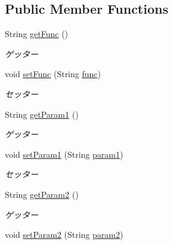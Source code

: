 \subsection*{Public Member Functions}
\begin{DoxyCompactItemize}
\item 
String \mbox{\hyperlink{classjp_1_1gr_1_1java__conf_1_1yuta__yoshinaga_1_1reversi_1_1model_1_1_funcs_json_adb9267487ecb01372d9332bee84f6378}{get\+Func}} ()
\begin{DoxyCompactList}\small\item\em ゲッター \end{DoxyCompactList}\item 
void \mbox{\hyperlink{classjp_1_1gr_1_1java__conf_1_1yuta__yoshinaga_1_1reversi_1_1model_1_1_funcs_json_adf43551693f93f2db4751a6fa8695d94}{set\+Func}} (String \mbox{\hyperlink{classjp_1_1gr_1_1java__conf_1_1yuta__yoshinaga_1_1reversi_1_1model_1_1_funcs_json_a8ca78c0a7064d28493ff6191e83f0d9b}{func}})
\begin{DoxyCompactList}\small\item\em セッター \end{DoxyCompactList}\item 
String \mbox{\hyperlink{classjp_1_1gr_1_1java__conf_1_1yuta__yoshinaga_1_1reversi_1_1model_1_1_funcs_json_a17ed3cd16403a8b83b61fa069556c68e}{get\+Param1}} ()
\begin{DoxyCompactList}\small\item\em ゲッター \end{DoxyCompactList}\item 
void \mbox{\hyperlink{classjp_1_1gr_1_1java__conf_1_1yuta__yoshinaga_1_1reversi_1_1model_1_1_funcs_json_ac7e00df5981b30ec420ef250477d9b23}{set\+Param1}} (String \mbox{\hyperlink{classjp_1_1gr_1_1java__conf_1_1yuta__yoshinaga_1_1reversi_1_1model_1_1_funcs_json_a2d271ee18dc5c39d0f3ab52bfde0bc27}{param1}})
\begin{DoxyCompactList}\small\item\em セッター \end{DoxyCompactList}\item 
String \mbox{\hyperlink{classjp_1_1gr_1_1java__conf_1_1yuta__yoshinaga_1_1reversi_1_1model_1_1_funcs_json_a032d83a0530a2f08fdaeba14eb5c1dcd}{get\+Param2}} ()
\begin{DoxyCompactList}\small\item\em ゲッター \end{DoxyCompactList}\item 
void \mbox{\hyperlink{classjp_1_1gr_1_1java__conf_1_1yuta__yoshinaga_1_1reversi_1_1model_1_1_funcs_json_aa1d17801d47f0d701f6792fa5f06e435}{set\+Param2}} (String \mbox{\hyperlink{classjp_1_1gr_1_1java__conf_1_1yuta__yoshinaga_1_1reversi_1_1model_1_1_funcs_json_a9f1f2c60a1435b78e440030fd0b5f825}{param2}})

\end{DoxyCompactItemize}
